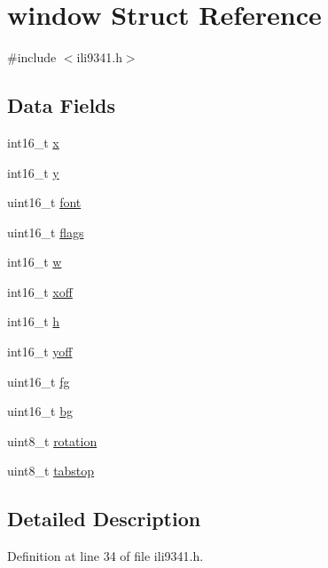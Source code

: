 \hypertarget{structwindow}{\section{window Struct Reference}
\label{structwindow}
}


{\ttfamily \#include $<$ili9341.\-h$>$}

\subsection*{Data Fields}
\begin{DoxyCompactItemize}
\item 
int16\-\_\-t \hyperlink{structwindow_a879b99940dfc34772f0257f54c67b817}{x}
\item 
int16\-\_\-t \hyperlink{structwindow_a95c7023fc42e79ab42c291b90a490776}{y}
\item 
uint16\-\_\-t \hyperlink{structwindow_acee24e56db43557a46cbb5ca3fe35021}{font}
\item 
uint16\-\_\-t \hyperlink{structwindow_ad58fae853f87093ef4f0139df0a3f33d}{flags}
\item 
int16\-\_\-t \hyperlink{structwindow_ad89fdeb11ce94e2e7501f7290372d6ae}{w}
\item 
int16\-\_\-t \hyperlink{structwindow_a12d0408f393bc8d23cc3f1ce46c39879}{xoff}
\item 
int16\-\_\-t \hyperlink{structwindow_a822391abd5d09e6ce7152f68cff3ef2b}{h}
\item 
int16\-\_\-t \hyperlink{structwindow_a95c482caa25e4a283d962643d410bc29}{yoff}
\item 
uint16\-\_\-t \hyperlink{structwindow_ac8739cdb3c50efcc1deaa5ab955a5e62}{fg}
\item 
uint16\-\_\-t \hyperlink{structwindow_affcf5d29153103c2537542f5a4f8ba87}{bg}
\item 
uint8\-\_\-t \hyperlink{structwindow_afbd48ebcb41e68d0f458dac593578aa8}{rotation}
\item 
uint8\-\_\-t \hyperlink{structwindow_a88d2836d45dd428d8fadfd703f0f965f}{tabstop}
\end{DoxyCompactItemize}


\subsection{Detailed Description}


Definition at line 34 of file ili9341.\-h.




